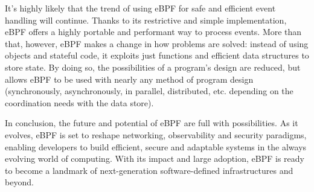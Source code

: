 It’s highly likely that the trend of using eBPF for safe and efficient event handling will continue.
Thanks to its restrictive and simple implementation, eBPF offers a highly portable and performant way to process events. 
More than that, however, eBPF makes a change in how problems are solved: instead of using objects and stateful code, it exploits just functions and efficient data structures to store state. 
By doing so, the possibilities of a program’s design are reduced, but allows eBPF to be used with nearly any method of program design (synchronously, asynchronously, in parallel, distributed, etc. depending on the coordination needs with the data store).

In conclusion, the future and potential of eBPF are full with possibilities. 
As it evolves, eBPF is set to reshape networking, observability and security paradigms, enabling developers to build efficient, secure and adaptable systems in the always evolving world of computing. 
With its impact and large adoption, eBPF is ready to become a landmark of next-generation software-defined infrastructures and beyond.
